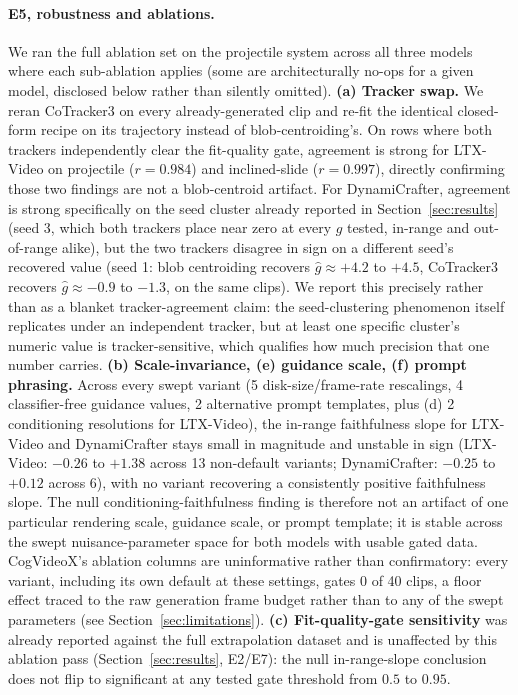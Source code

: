 \paragraph{E5, robustness and ablations.}
We ran the full ablation set on the projectile system across all three
models where each sub-ablation applies (some are architecturally no-ops
for a given model, disclosed below rather than silently omitted).
\textbf{(a) Tracker swap.} We reran CoTracker3 \citep{karaev2023cotracker}
on every already-generated clip and re-fit the identical closed-form
recipe on its trajectory instead of blob-centroiding's. On rows where
both trackers independently clear the fit-quality gate, agreement is
strong for LTX-Video on projectile ($r=0.984$) and inclined-slide
($r=0.997$), directly confirming those two findings are not a
blob-centroid artifact. For DynamiCrafter, agreement is strong specifically
on the seed cluster already reported in Section~\ref{sec:results} (seed 3,
which both trackers place near zero at every $g$ tested, in-range and
out-of-range alike), but the two trackers disagree in sign on a different
seed's recovered value (seed 1: blob centroiding recovers $\hat g\approx
+4.2$ to $+4.5$, CoTracker3 recovers $\hat g\approx-0.9$ to $-1.3$, on the
same clips). We report this precisely rather than as a blanket
tracker-agreement claim: the seed-clustering phenomenon itself replicates
under an independent tracker, but at least one specific cluster's numeric
value is tracker-sensitive, which qualifies how much precision that one
number carries. \textbf{(b) Scale-invariance, (e) guidance scale, (f)
prompt phrasing.} Across every swept variant (5 disk-size/frame-rate
rescalings, 4 classifier-free guidance values, 2 alternative prompt
templates, plus (d) 2 conditioning resolutions for LTX-Video), the
in-range faithfulness slope for LTX-Video and DynamiCrafter stays small in
magnitude and unstable in sign (LTX-Video: $-0.26$ to $+1.38$ across 13
non-default variants; DynamiCrafter: $-0.25$ to $+0.12$ across 6), with no
variant recovering a consistently positive faithfulness slope. The null
conditioning-faithfulness finding is therefore not an artifact of one
particular rendering scale, guidance scale, or prompt template; it is
stable across the swept nuisance-parameter space for both models with
usable gated data. CogVideoX's ablation columns are uninformative rather
than confirmatory: every variant, including its own default at these
settings, gates 0 of 40 clips, a floor effect traced to the raw generation
frame budget rather than to any of the swept parameters (see
Section~\ref{sec:limitations}). \textbf{(c) Fit-quality-gate sensitivity}
was already reported against the full extrapolation dataset and is
unaffected by this ablation pass (Section~\ref{sec:results}, E2/E7): the
null in-range-slope conclusion does not flip to significant at any tested
gate threshold from $0.5$ to $0.95$.

